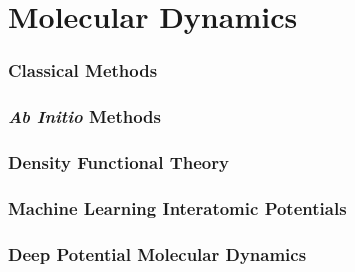 \chapter{Molecular Dynamics}

\subsection{Classical Methods}

\subsection{\textit{Ab Initio} Methods}

\subsection{Density Functional Theory}

\subsection{Machine Learning Interatomic Potentials}

\subsection{Deep Potential Molecular Dynamics}
